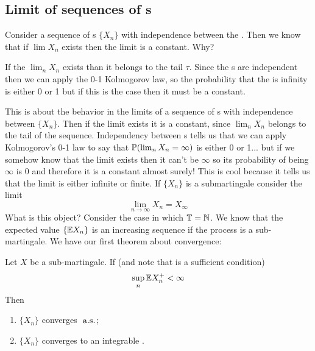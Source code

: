 \documentclass{report}
\begin{document}
\subsection{Limit of sequences of \rv s}
Consider a sequence of \rv s $\{X_{n}\}$ with independence between the \rv. Then we know that if $\lim X_{n}$ exists then the limit is a constant. Why?
\begin{remark}
	If the $\lim_{n}X_{n}$ exists than it belongs to the tail \sa{} $\tau$. Since the \rv s are independent then we can apply the 0-1 Kolmogorov law, so the probability that the \rv{} is infinity is either 0 or 1 but if this is the case then it must be a constant.
\end{remark}
This is about the behavior in the limits of a sequence of \rv s with independence between $\{X_{n}\}$. Then if the limit exists it is a constant, since $\lim_{n}X_{n}$ belongs to the tail \sa{} of the sequence. Independency between \rv s tells us that we can apply Kolmogorov's 0-1 law to say that $\mathbb{P}(\lim_{n}X_{n}=\infty)$ is either 0 or 1... but if we somehow know that the limit exists then it can't be $\infty$ so its probability of being $\infty$ is 0 and therefore it is a constant almost surely! This is cool because it tells us that the limit is either infinite or finite.
If $\{X_{n}\}$ is a submartingale consider the limit 
\begin{equation*}
	\lim_{n\to\infty}X_{n}=X_{\infty}
\end{equation*}
What is this object? Consider the case in which $\mathbb{T}=\mathbb{N}$. We know that the expected value $\{\mathbb{E} X_{n}\}$ is an increasing sequence if the process is a sub-martingale. 
We have our first theorem about convergence:
\begin{theorem}
	Let $X$ be a sub-martingale. If (and note that is a sufficient condition)
	\begin{equation*}
		\sup_{n}\mathbb{E} X_{n}^{+}<\infty
	\end{equation*}
	Then
	\begin{enumerate}
		\item $\{X_{n}\}$ converges $\text{ a.s.}$;
		\item $\{X_{n}\}$ converges to an integrable \rv.
	\end{enumerate}
\end{theorem}
\end{document}
